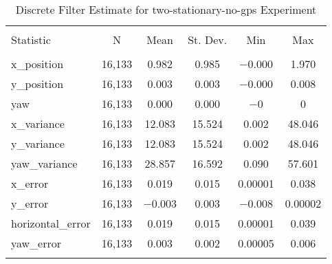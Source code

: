 
\begin{table}[h] \centering 
  \caption{Discrete Filter Estimate for two-stationary-no-gps Experiment} 
  \label{tab:two_stationary_no_gps_discrete_summary} 
\begin{tabular}{@{\extracolsep{5pt}}lccccc} 
\\[-1.8ex]\hline 
\hline \\[-1.8ex] 
Statistic & \multicolumn{1}{c}{N} & \multicolumn{1}{c}{Mean} & \multicolumn{1}{c}{St. Dev.} & \multicolumn{1}{c}{Min} & \multicolumn{1}{c}{Max} \\ 
\hline \\[-1.8ex] 
x\_position & 16,133 & 0.982 & 0.985 & $-$0.000 & 1.970 \\ 
y\_position & 16,133 & 0.003 & 0.003 & $-$0.000 & 0.008 \\ 
yaw & 16,133 & 0.000 & 0.000 & $-$0 & 0 \\ 
x\_variance & 16,133 & 12.083 & 15.524 & 0.002 & 48.046 \\ 
y\_variance & 16,133 & 12.083 & 15.524 & 0.002 & 48.046 \\ 
yaw\_variance & 16,133 & 28.857 & 16.592 & 0.090 & 57.601 \\ 
x\_error & 16,133 & 0.019 & 0.015 & 0.00001 & 0.038 \\ 
y\_error & 16,133 & $-$0.003 & 0.003 & $-$0.008 & 0.00002 \\ 
horizontal\_error & 16,133 & 0.019 & 0.015 & 0.00001 & 0.039 \\ 
yaw\_error & 16,133 & 0.003 & 0.002 & 0.00005 & 0.006 \\ 
\hline \\[-1.8ex] 
\end{tabular} 
\end{table} 
